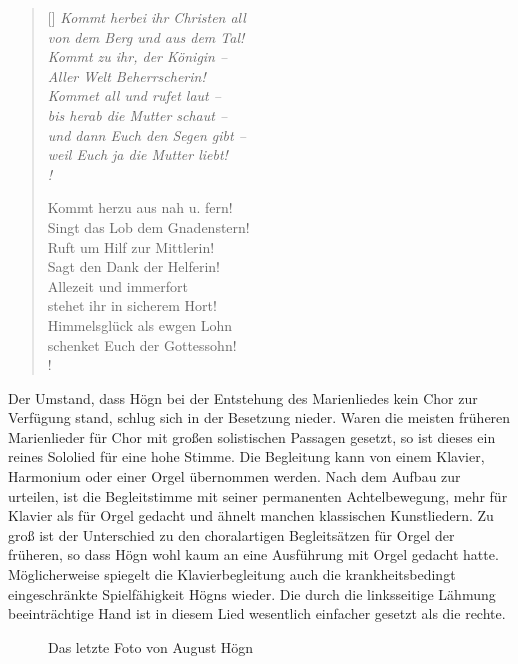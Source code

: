 \settowidth{\versewidth}{Singt das Lob dem Gnadenstern!}

\begin{verse}[\versewidth]
\itshape
Kommt herbei ihr Christen all \\
von dem Berg und aus dem Tal! \\
Kommt zu ihr, der Königin – \\
Aller Welt Beherrscherin!\\
Kommet all und rufet laut – \\
bis herab die Mutter schaut – \\
und dann Euch den Segen gibt – \\
weil Euch ja die Mutter liebt! \\!

Kommt herzu aus nah u. fern! \\
Singt das Lob dem Gnadenstern! \\
Ruft um Hilf zur Mittlerin! \\
Sagt den Dank der Helferin! \\
Allezeit und immerfort \\
stehet ihr in sicherem Hort! \\
Himmelsglück als ewgen Lohn \\
schenket Euch der Gottessohn! \\!
\end{verse}

Der Umstand, dass Högn bei der Entstehung des Marienliedes kein Chor zur
Verfügung stand, schlug sich in der Besetzung nieder. Waren die meisten
früheren Marienlieder für Chor mit großen solistischen Passagen
gesetzt, so ist dieses ein reines Sololied für eine hohe Stimme. Die
Begleitung kann von einem Klavier, Harmonium oder einer Orgel
übernommen werden. Nach dem Aufbau zur urteilen, ist die Begleitstimme
mit seiner permanenten Achtelbewegung, mehr für Klavier als für Orgel
gedacht und ähnelt manchen klassischen Kunstliedern. Zu groß ist der
Unterschied zu den choralartigen Begleitsätzen für Orgel der
früheren, so dass Högn wohl kaum an eine Ausführung mit Orgel gedacht
hatte. Möglicherweise spiegelt die Klavierbegleitung auch die
krankheitsbedingt eingeschränkte Spielfähigkeit Högns wieder. Die durch
die linksseitige Lähmung beeinträchtige Hand ist in diesem Lied
wesentlich einfacher gesetzt als die rechte.

\begin{figure}
\caption{Das letzte Foto von August Högn}
\end{figure}

